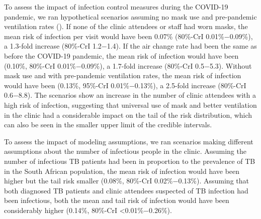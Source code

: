 \documentclass[fleqn,11pt]{wlscirep}
\begin{document}
To assess the impact of infection control measures during the COVID-19 pandemic, we ran hypothetical scenarios assuming no mask use and pre-pandemic ventilation rates (). If none of the clinic attendees or staff had worn masks, the mean risk of infection per visit would have been 0.07\% (80\%-CrI 0.01\%$-$0.09\%), a 1.3-fold increase (80\%-CrI 1.2$-$1.4). If the air change rate had been the same as before the COVID-19 pandemic, the mean risk of infection would have been (0.10\%, 80\%-CrI 0.01\%$-$0.09\%), a 1.7-fold increase (80\%-CrI 0.5$-$5.3). Without mask use and with pre-pandemic ventilation rates, the mean risk of infection would have been (0.13\%, 95\%-CrI 0.01\%$-$0.13\%), a 2.5-fold increase (80\%-CrI 0.6$-$8.8). The scenarios show an increase in the number of clinic attendees with a high risk of infection, suggesting that universal use of mask and better ventilation in the clinic had a considerable impact on the tail of the risk distribution, which can also be seen in the smaller upper limit of the credible intervals. 

To assess the impact of modeling assumptions, we ran scenarios making different assumptions about the number of infectious people in the clinic. Assuming the number of infectious TB patients had been in proportion to the prevalence of TB in the South African population, the mean risk of infection would have been higher but the tail risk smaller (0.08\%, 80\%-CrI 0.02\%$-$0.13\%). Assuming that both diagnosed TB patients and clinic attendees suspected of TB infection had been infectious, both the mean and tail risk of infection would have been considerably higher (0.14\%, 80\%-CrI <0.01\%$-$0.26\%).  
\end{document}
